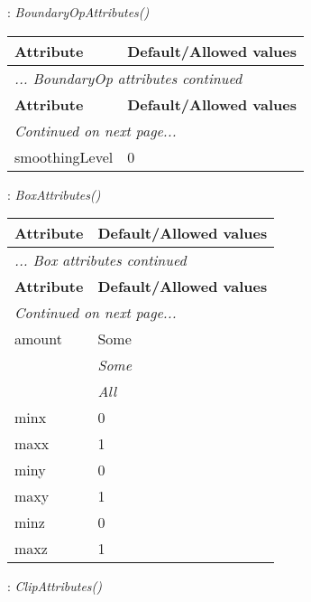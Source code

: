 \documentclass[10pt,a4paper]{report}
\begin{document}
\newpage

{}
: {\it BoundaryOpAttributes() }\\[-3mm]

\begin{longtable}{ll}
{\bf Attribute} & {\bf Default/Allowed values} \\
\hline \hline
\endfirsthead
\multicolumn{2}{l}{{\it ... BoundaryOp attributes continued}} \\
{\bf Attribute} & {\bf Default/Allowed values} \\
\hline \hline
\endhead
\hline
\multicolumn{2}{l}{{\it Continued on next page...}} \\
\endfoot
\hline
\endlastfoot

smoothingLevel  &  0 \\
\end{longtable}

\newpage

{}
: {\it BoxAttributes() }\\[-3mm]

\begin{longtable}{ll}
{\bf Attribute} & {\bf Default/Allowed values} \\
\hline \hline
\endfirsthead
\multicolumn{2}{l}{{\it ... Box attributes continued}} \\
{\bf Attribute} & {\bf Default/Allowed values} \\
\hline \hline
\endhead
\hline
\multicolumn{2}{l}{{\it Continued on next page...}} \\
\endfoot
\hline
\endlastfoot

amount  &  Some   \\
 & {\it  Some} \\
 & {\it  All} \\
minx  &  0 \\
maxx  &  1 \\
miny  &  0 \\
maxy  &  1 \\
minz  &  0 \\
maxz  &  1 \\
\end{longtable}

\newpage

{}
: {\it ClipAttributes() }\\[-3mm]
\end{document}
